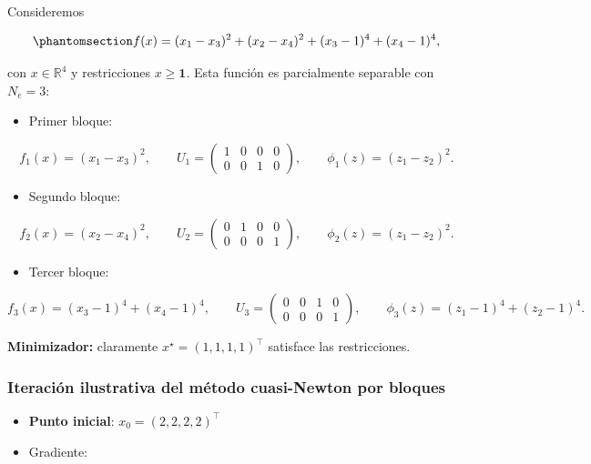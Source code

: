 \documentclass[
  spanish,
  us-letterpaper,
]{scrreprt}
\providecommand{\tightlist}{%
  \setlength{\itemsep}{0pt}\setlength{\parskip}{0pt}}
\numberwithin{equation}{section}
\begin{document}
Consideremos

\begin{equation}\phantomsection\label{eq-144}{
f(x) = (x_1 - x_3)^2 + (x_2 - x_4)^2 + (x_3 - 1)^4 + (x_4 - 1)^4,
}\end{equation}

con \(x\in\mathbb{R}^4\) y restricciones \(x\ge \mathbf{1}\). Esta
función es parcialmente separable con \(N_e=3\):

\begin{itemize}
\tightlist
\item
  Primer bloque:
\end{itemize}

\[
f_1(x)=(x_1-x_3)^2, \qquad
U_1=
\begin{pmatrix}
1 & 0 & 0 & 0 \\
0 & 0 & 1 & 0
\end{pmatrix}, \qquad
\phi_1(z)=(z_1-z_2)^2.
\]

\begin{itemize}
\tightlist
\item
  Segundo bloque:
\end{itemize}

\[
f_2(x)=(x_2-x_4)^2, \qquad
U_2=
\begin{pmatrix}
0 & 1 & 0 & 0 \\
0 & 0 & 0 & 1
\end{pmatrix}, \qquad
\phi_2(z)=(z_1-z_2)^2.
\]

\begin{itemize}
\tightlist
\item
  Tercer bloque:
\end{itemize}

\[
f_3(x)=(x_3-1)^4+(x_4-1)^4, \qquad
U_3=
\begin{pmatrix}
0 & 0 & 1 & 0 \\
0 & 0 & 0 & 1
\end{pmatrix}, \qquad
\phi_3(z)=(z_1-1)^4+(z_2-1)^4.
\]

\textbf{Minimizador:} claramente \(x^\star=(1,1,1,1)^\top\) satisface
las restricciones.

\subsubsection{Iteración ilustrativa del método cuasi-Newton por
bloques}\label{iteraciuxf3n-ilustrativa-del-muxe9todo-cuasi-newton-por-bloques}

\begin{itemize}
\tightlist
\item
  \textbf{Punto inicial}: \(x_0=(2,2,2,2)^\top\)\\
\item
  Gradiente:
\end{itemize}
\end{document}
